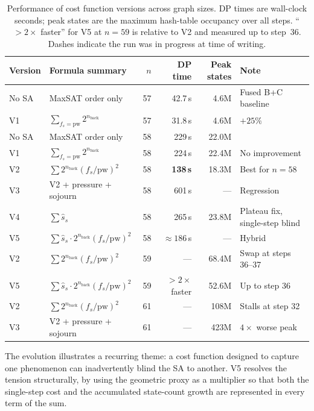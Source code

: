 \documentclass[12pt]{article}
\theoremstyle{definition}
\newcommand{\pw}{\mathrm{pw}}
\newcommand{\nb}{n_{\mathrm{back}}}
\newcommand{\proxy}{\hat{s}}   %
\begin{document}
\begin{table}[H]
\centering
\caption{Performance of cost function versions across graph sizes.
  DP times are wall-clock seconds; peak states are the maximum hash-table
  occupancy over all steps.
  ``$>2\times$ faster'' for V5 at $n=59$ is relative to V2 and measured
  up to step~36.  Dashes indicate the run was in progress at time of writing.}
\label{tab:costfn}
\small
\setlength{\tabcolsep}{4pt}
\begin{tabular}{llrrrl}
\toprule
Version & Formula summary & $n$ & DP time & Peak states & Note \\
\midrule
No SA & MaxSAT order only
  & 57 & 42.7\,s & 4.6M & Fused B+C baseline \\
V1 & $\sum_{f_s=\pw} 2^{\nb}$
  & 57 & 31.8\,s & 4.6M & $+25\%$ \\
\midrule
No SA & MaxSAT order only
  & 58 & 229\,s  & 22.0M & \\
V1 & $\sum_{f_s=\pw} 2^{\nb}$
  & 58 & 224\,s  & 22.4M & No improvement \\
V2 & $\sum 2^{\nb}(f_s/\pw)^2$
  & 58 & \textbf{138\,s}  & 18.3M & Best for $n=58$ \\
V3 & V2 + pressure + sojourn
  & 58 & 601\,s  & ---   & Regression \\
V4 & $\sum \proxy_s$
  & 58 & 265\,s  & 23.8M & Plateau fix, single-step blind \\
V5 & $\sum \proxy_s \cdot 2^{\nb}(f_s/\pw)^2$
  & 58 & $\approx 186$\,s & --- & Hybrid \\
\midrule
V2 & $\sum 2^{\nb}(f_s/\pw)^2$
  & 59 & --- & 68.4M & Swap at steps 36--37 \\
V5 & $\sum \proxy_s \cdot 2^{\nb}(f_s/\pw)^2$
  & 59 & $>2\times$ faster & 52.6M & Up to step 36 \\
\midrule
V2 & $\sum 2^{\nb}(f_s/\pw)^2$
  & 61 & --- & 108M & Stalls at step 32 \\
V3 & V2 + pressure + sojourn
  & 61 & --- & 423M & $4\times$ worse peak \\
\bottomrule
\end{tabular}
\end{table}

The evolution illustrates a recurring theme: a cost function designed to
capture one phenomenon can inadvertently blind the SA to another.
V5 resolves the tension structurally, by using the geometric proxy as a
multiplier so that both the single-step cost and the accumulated
state-count growth are represented in every term of the sum.
\end{document}

